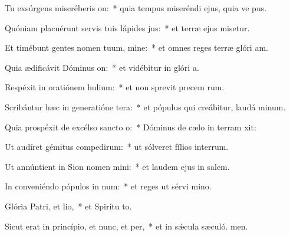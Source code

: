 \item Tu exsúrgens miseréberis on:~* quia tempus miseréndi ejus, quia ve pus.
\item Quóniam placuérunt servis tuis lápides jus:~* et terræ ejus misetur.
\item Et timébunt gentes nomen tuum, mine:~* et omnes reges terræ glóri am.
\item Quia ædificávit Dóminus on:~* et vidébitur in glóri a.
\item Respéxit in oratiónem hulium:~* et non sprevit precem rum.
\item Scribántur hæc in generatióne tera:~* et pópulus qui creábitur, laudá minum.
\item Quia prospéxit de excélso sancto o:~* Dóminus de cælo in terram xit:
\item Ut audíret gémitus compedirum:~* ut sólveret fílios interrum.
\item Ut annúntient in Sion nomen mini:~* et laudem ejus in salem.
\item In conveniéndo pópulos in num:~* et reges ut sérvi mino.
\item Glória Patri, et lio,~* et Spirítu to.
\item Sicut erat in princípio, et nunc, et per,~* et in sǽcula sæculó. men.
